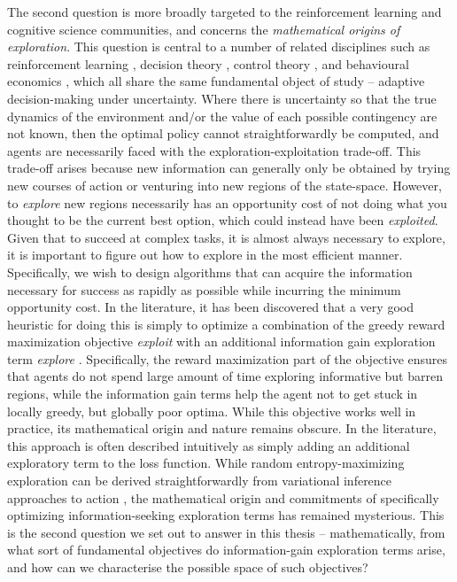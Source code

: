 The second question is more broadly targeted to the reinforcement learning and cognitive science communities, and concerns the \emph{mathematical origins of exploration}. This question is central to a number of related disciplines such as reinforcement learning \citep{sutton2018reinforcement}, decision theory \citep{daw2006cortical}, control theory \citep{kalman1960contributions}, and behavioural economics \citep{tversky1974judgment}, which all share the same fundamental object of study -- adaptive decision-making under uncertainty. Where there is uncertainty so that the true dynamics of the environment and/or the value of each possible contingency are not known, then the optimal policy cannot straightforwardly be computed, and agents are necessarily faced with the exploration-exploitation trade-off. This trade-off arises because new information can generally only be obtained by trying new courses of action or venturing into new regions of the state-space. However, to \emph{explore} new regions necessarily has an opportunity cost of not doing what you thought to be the current best option, which could instead have been \emph{exploited}. Given that to succeed at complex tasks, it is almost always necessary to explore, it is important to figure out how to explore in the most efficient manner. Specifically, we wish to design algorithms that can acquire the information necessary for success as rapidly as possible while incurring the minimum opportunity cost. In the literature, it has been discovered that a very good heuristic for doing this is simply to optimize a combination of the greedy reward maximization objective \emph{exploit} with an additional information gain exploration term \emph{explore} \citep{shyam_model-based_2019,schmidhuber2007simple,tschantz2020reinforcement}. Specifically, the reward maximization part of the objective ensures that agents do not spend large amount of time exploring informative but barren regions, while the information gain terms help the agent not to get stuck in locally greedy, but globally poor optima. While this objective works well in practice, its mathematical origin and nature remains obscure. In the literature, this approach is often described intuitively as simply adding an additional exploratory term to the loss function. While random entropy-maximizing exploration can be derived straightforwardly from variational inference approaches to action \citep{levine2018reinforcement}, the mathematical origin and commitments of specifically optimizing information-seeking exploration terms has remained mysterious. This is the second question we set out to answer in this thesis -- mathematically, from what sort of fundamental objectives do information-gain exploration terms arise, and how can we characterise the possible space of such objectives?

